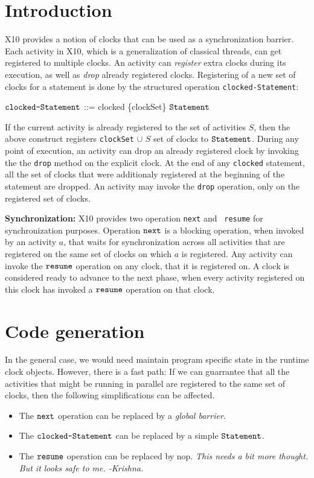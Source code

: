\documentclass{article}
\def\cS{\mbox{\tt clocked-Statement}}
\def\stmt{\mbox{\tt Statement}}
\def\next{\mbox{\tt next}}
\def\resume{\mbox{\tt resume}}
\begin{document}
\section {Introduction}
X10 provides a notion of clocks that can be used as a synchronization
barrier.
Each activity in X10, which is a generalization of classical threads, can
get registered to multiple clocks.
An activity can {\em register} extra clocks during its execution, as well
as {\em drop } already registered clocks.
Registering of a new set of clocks for a statement is done by
the structured operation {\tt clocked-Statement}:

        $\cS$ ::= clocked \{clockSet\} $\stmt$

If the current activity is already registered to the set of activities
$S$, then the above construct registers {\tt clockSet} $\cup$ $S$ 
set of clocks to $\stmt$.
During any point of execution, an activity can drop an already registered
clock by invoking the the {\tt drop} method on the explicit clock.
At the end of any {\tt clocked} statement, all the set of clocks that were
additionaly registered at the beginning of the statement are dropped.
An activity may invoke the {\tt drop} operation, only on the registered
set of clocks.

{\bf Synchronization:} X10 provides two operation {\tt next} and {\tt
resume} for synchronization purposes.
Operation $\next$ is a blocking operation, when invoked by an activity
$a$, that waits for synchronization across all activities that are
registered on the same set of clocks on which $a$ is registered.
Any activity can invoke the $\resume$ operation on any clock, that it is
registered on. 
A clock is considered ready to advance to the next phase, when every
activity registered on this clock has invoked a $\resume$ operation on
that clock.

\section{Code generation}
In the general case, we would need maintain program specific state in the
runtime clock objects.
However, there is a fast path: If we can guarrantee that all the
activities that might be running in parallel are registered to the same
set of clocks, then the following simplifications can be affected.
\begin{itemize}
\item The $\next$ operation can be replaced by a {\em global barrier}.
\item The $\cS$ can be replaced by a simple $\stmt$.
\item The $\resume$ operation can be replaced by nop. {\em This needs a
bit more thought. But it looks safe to me. -Krishna.}
\end{itemize}
\end{document}
